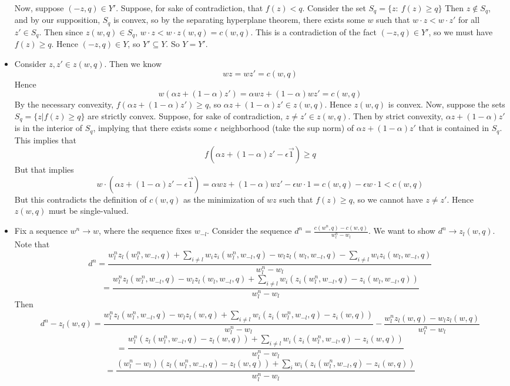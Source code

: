 \documentclass[10pt,letter]{article}
\begin{document}
\begin{itemize}
Now, suppose $(-z, q) \in Y'$. Suppose, for sake of contradiction, that $f(z) < q$. Consider the set $S_q = \{z : \ f(z) \ge q \}$ Then $z \not \in S_q$, and by our supposition, $S_q$ is convex, so by the separating hyperplane theorem, there exists some $w$ such that $w \cdot z < w \cdot z'$ for all $z' \in S_q$. Then since $z(w, q) \in S_q$, $w \cdot z < w \cdot z(w,q) = c(w, q)$. This is a contradiction of the fact $(-z, q) \in Y'$, so we must have $f(z) \ge q$. Hence $(-z, q) \in Y$, so $Y' \subseteq Y$. So $Y = Y'$.
\item Consider $z, z' \in z(w,q)$. Then we know
\[ w z = wz' = c(w, q) \]
Hence
\[ w(\alpha z + (1-\alpha) z') = \alpha w z + (1-\alpha) w z' = c(w,q) \]
By the necessary convexity, $f(\alpha z + (1-\alpha) z') \ge q$, so $\alpha z + (1-\alpha)z' \in z(w,q)$. Hence $z(w,q)$ is convex. Now, suppose the sets $S_q = \{ z | f(z) \ge q \}$ are strictly convex. Suppose, for sake of contradiction, $z \neq z' \in z(w,q)$. Then by strict convexity, $\alpha z + (1-\alpha)z'$ is in the interior of $S_q$, implying that there exists some $\epsilon$ neighborhood (take the sup norm) of $\alpha z + (1-\alpha) z' $ that is contained in $S_q$. This implies that
\[ f( \alpha z + (1-\alpha)z' - \epsilon \vec{1}) \ge q \]
But that implies
\[ w\cdot( \alpha z + (1-\alpha)z' - \epsilon \vec{1}) = \alpha wz + (1-\alpha)wz' - \epsilon w\cdot 1 = c(w,q)- \epsilon w\cdot 1 < c(w,q)   \]
But this contradicts the definition of $c(w,q)$ as the minimization of $wz$ such that $f(z) \ge q$, so we cannot have $z \neq z'$. Hence $z(w,q)$ must be single-valued.
\item Fix a sequence $w^n \to w$, where the sequence fixes $w_{-l}$. Consider the sequence $d^n = \frac{c(w^n, q) - c(w, q)}{w^n_l - w_l}$. We want to show $d^n \to z_l(w, q)$. Note that
\[ d^n = \frac{w^n_l z_l(w^n_l, w_{-l}, q) + \sum_{i \neq l} w_i z_i(w^n_l, w_{-l}, q)  - w_l z_l(w_l, w_{-l}, q) - \sum_{i \neq l} w_i z_i(w_l, w_{-l}, q)}{w^n_l - w_l} \]
\[ = \frac{w^n_l z_l(w^n_l, w_{-l}, q)- w_l z_l(w_l, w_{-l}, q) + \sum_{i \neq l} w_i (z_i(w^n_l, w_{-l}, q) - z_i(w_l, w_{-l}, q))}{w^n_l - w_l} \]
Then
\[ d^n - z_l(w,q) = \frac{w^n_l z_l(w^n_l, w_{-l}, q)- w_l z_l(w, q) + \sum_{i \neq l} w_i (z_i(w^n_l, w_{-l}, q) - z_i(w, q))}{w^n_l - w_l} - \frac{w^n_lz_l(w,q) - w_l z_l(w,q)}{w^n_l - w_l} \]
\[ = \frac{w^n_l (z_l(w^n_l, w_{-l}, q)-  z_l(w, q)) + \sum_{i \neq l} w_i (z_i(w^n_l, w_{-l}, q) - z_i(w, q))}{w^n_l - w_l} \]\[ = \frac{(w^n_l - w_l) (z_l(w^n_l, w_{-l}, q)-  z_l(w, q)) + \sum_{i} w_i (z_i(w^n_l, w_{-l}, q) - z_i(w, q))}{w^n_l - w_l} \]

\end{itemize}
\end{document}
